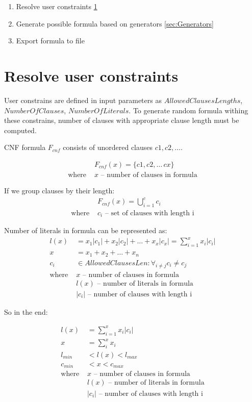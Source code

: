 \begin{enumerate}
  \item Resolve user constraints \ref{sec:ResolveUserConstrains}
  \item Generate possible formula based on generators \ref{sec:Generators}
  \item Export formula to file
\end{enumerate}

\section{Resolve user constraints}
\label{sec:ResolveUserConstrains}

User constrains are defined in input parameters as $AllowedClausesLengths$, $NumberOfClauses$, $NumberOfLiterals$. To generate random formula withing these constrains, number of clauses with appropriate clause length must be computed.

CNF formula $F_{cnf}$ consists of unordered clauses $c1, c2, \dots$. 

\begin{align*}
	&F_{cnf}(x) = \{c1, c2, \dots\, cx\} \\
	\text{where }
		&x \text{ -- number of clauses in formula}
\end{align*}

If we group clauses by their length:
\begin{align*}
	&F_{cnf}(x) = \bigcup_{i=1}^c c_i \\
	\text{where }
		&c_i \text{ -- set of clauses with length i} 
\end{align*}

Number of literals in formula can be represented as:
\begin{align*}
	l(x) &= x_1|c_1| + x_2|c_2| + \dots + x_x|c_x| = \sum_{i=1}^{x} x_i |c_i| \\
	x &= x_1 + x_2 + \dots + x_n \\
	c_i &\in AllowedClausesLen: \forall_{i \neq j} c_i \neq c_j  \\
	\text{where }
		&x \text{ -- number of clauses in formula} \\ 
		&l(x) \text{ -- number of literals in formula} \\ 
		&|c_i| \text{ -- number of clauses with length i} 
\end{align*}

So in the end:

\begin{align}
	l(x) &= \sum_{i=1}^{x} x_i |c_i| \\
	x &= \sum_i^x x_i \\
	l_{min} &< l(x) < l_{max} \\
	c_{min} &< x < c_{max} \\
	\text{where } 
		&x \text{ -- number of clauses in formula} \nonumber \\
		&l(x) \text{ -- number of literals in formula} \nonumber  \\
		&|c_i| \text{ -- number of clauses with length i} \nonumber
\end{align}

